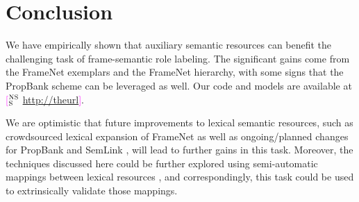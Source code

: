 \documentclass[11pt,a4paper]{article}
\newcommand{\ensuretext}[1]{#1}
\newcommand{\nssmarker}{\ensuretext{\textcolor{magenta}{\ensuremath{^{\textsc{NS}}_{\textsc{S}}}}}}
\newcommand{\mkmarker}{\ensuretext{\textcolor{red}{\ensuremath{^{\textsc{M}}_{\textsc{K}}}}}}
\newcommand{\arkcomment}[3]{\ensuretext{\textcolor{#3}{[#1 #2]}}}
\newcommand{\nss}[1]{\arkcomment{\nssmarker}{#1}{magenta}}
\newcommand{\mk}[1]{\arkcomment{\mkmarker}{#1}{red}}
\newcommand{\finalversion}[1]{#1}
\begin{document}






\section{Conclusion}
We have empirically shown that auxiliary semantic resources
can benefit the challenging task of frame-semantic role labeling. 
The significant gains come from the FrameNet exemplars and the FrameNet hierarchy, with
some signs that the PropBank scheme can be leveraged as well.
Our code and models are available at
\nss{\url{http://theurl}}.

\finalversion{We are optimistic that future improvements to lexical semantic resources, 
such as crowdsourced lexical expansion of FrameNet \citep{pavlick-15} 
as well as ongoing/planned changes for PropBank \citep{bonial-14} and SemLink \citep{bonial-13}, 
will lead to further gains in this task. 
Moreover, the techniques discussed here could be further explored 
using semi-automatic mappings between lexical resources \citep[such as UBY;][]{gurevych-12}, 
and correspondingly, this task could be used to extrinsically validate those mappings.}
\end{document}
